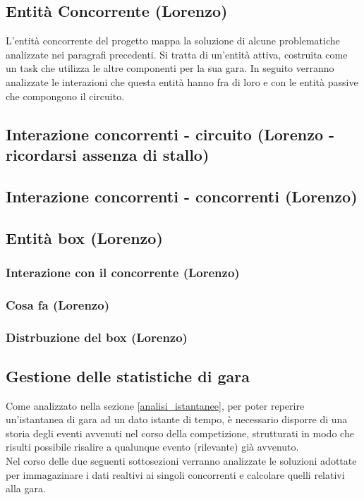 \subsection{Entit\`{a} Concorrente (Lorenzo)}
L'entità concorrente del progetto mappa la soluzione di alcune problematiche analizzate nei paragrafi precedenti. Si tratta di un'entità attiva, costruita come un task che utilizza le altre componenti per la sua gara. In seguito verranno analizzate le interazioni che questa entità hanno fra di loro e con le entità passive che compongono il circuito.
\subsection{Interazione concorrenti - circuito (Lorenzo - ricordarsi assenza di stallo)}
\subsection{Interazione concorrenti - concorrenti (Lorenzo)}
\subsection{Entità box (Lorenzo)}
     \subsubsection{Interazione con il concorrente (Lorenzo)}
     \subsubsection{Cosa fa (Lorenzo)}
     \subsubsection{Distrbuzione del box (Lorenzo)}
\subsection{Gestione delle statistiche di gara}
\label{statistiche}
Come analizzato nella sezione \ref{analisi_istantanee}, per poter reperire un'istantanea di gara ad un dato istante di tempo, è necessario
disporre di una storia degli eventi avvenuti nel corso della competizione, strutturati in modo che risulti possibile risalire a qualunque evento
(rilevante) già avvenuto.\\ 
Nel corso delle due seguenti sottosezioni verranno analizzate le soluzioni adottate per immagazinare i dati realtivi ai singoli concorrenti
e calcolare quelli relativi alla gara.
